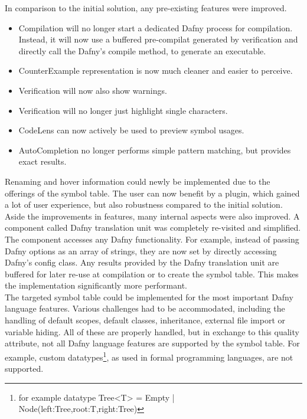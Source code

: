 In comparison to the initial solution, any pre-existing features were improved.

\begin{itemize}
 \item Compilation will no longer start a dedicated Dafny process for compilation. Instead, it will now use a buffered pre-compilat generated by verification and directly call the Dafny's compile method, to generate an executable.
 \item CounterExample representation is now much cleaner and easier to perceive.
 \item Verification will now also show warnings.
 \item Verification will no longer just highlight single characters.
 \item CodeLens can now actively be used to preview symbol usages.
 \item AutoCompletion no longer performs simple pattern matching, but provides exact results.
\end{itemize}
Renaming and hover information could newly be implemented due to the offerings of the symbol table.
The user can now benefit by a plugin, which gained a lot of user experience, but also robustness compared to the initial solution.\\

Aside the improvements in features, many internal aspects were also improved.
A component called Dafny translation unit was completely re-visited and simplified.
The component accesses any Dafny functionality.
For example, instead of passing Dafny options as an array of strings, they are now set by
directly accessing Dafny's config class.
Any results provided by the Dafny translation unit are buffered for later re-use at compilation or to create the symbol table.
This makes the implementation significantly more performant.\\

The targeted symbol table could be implemented for the most important Dafny language features.
Various challenges had to be accommodated, including the handling of default scopes, default classes, inheritance, external file import or variable hiding.
All of these are properly handled, but in exchange to this quality attribute, not all Dafny language features are supported by the symbol table.
For example, custom datatypes\footnote{for example datatype Tree<T> = Empty | Node(left:Tree,root:T,right:Tree)}, as used in formal programming languages, are not supported.\\

